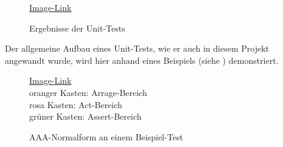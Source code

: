 \begin{figure}[ht!]
\vspace{0.25cm}
\begin{center}
\caption{Ergebnisse der Unit-Tests}
\label{fig:TestRes}
\end{center}

\vspace{0.25cm}
\href{https://github.com/MaagMich/SWE2\_Project/blob/c5c3674bd201ee306463881cf711bb2ce9229842/Ausarbeitung/Pictures/Test\%20Result.png}{Image-Link}
\end{figure}


Der allgemeine Aufbau eines Unit-Tests, wie er auch in diesem Projekt angewandt wurde, wird hier anhand eines Beispiels (siehe ) demonstriert.

\begin{figure}[ht!]
\vspace{0.25cm}
\begin{center}
\caption{AAA-Normalform an einem Beispiel-Test}
\label{fig:TestAAA}
\end{center}

\vspace{0.25cm}
\href{https://github.com/MaagMich/SWE2\_Project/blob/c5c3674bd201ee306463881cf711bb2ce9229842/Ausarbeitung/Pictures/Test\%20AAA.png}{Image-Link}\\
oranger Kasten:	Arrage-Bereich\\
rosa Kasten: Act-Bereich\\
grüner Kasten: Assert-Bereich
\end{figure}


